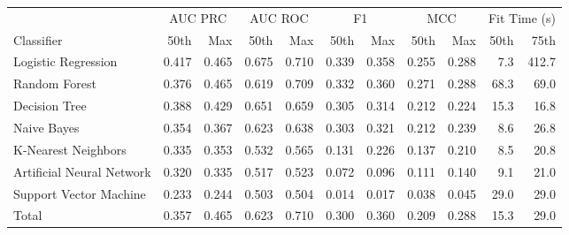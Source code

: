 \begin{tabular}{lrrrrrrrrrr}
\toprule
{} & \multicolumn{2}{c}{AUC PRC}        & \multicolumn{2}{c}{AUC ROC}        &     \multicolumn{2}{c}{F1}       &    \multicolumn{2}{c}{MCC}        & \multicolumn{2}{c}{Fit Time (s)}         \\
{Classifier} &    50th &    Max &    50th &    Max &   50th &    Max &   50th &    Max &         50th &     75th \\
\midrule
Logistic Regression       &   0.417 &  0.465 &   0.675 &  0.710 &  0.339 &  0.358 &  0.255 &  0.288 &        7.3 &  412.7 \\
Random Forest             &   0.376 &  0.465 &   0.619 &  0.709 &  0.332 &  0.360 &  0.271 &  0.288 &       68.3 &   69.0 \\
Decision Tree             &   0.388 &  0.429 &   0.651 &  0.659 &  0.305 &  0.314 &  0.212 &  0.224 &       15.3 &   16.8 \\
Naive Bayes               &   0.354 &  0.367 &   0.623 &  0.638 &  0.303 &  0.321 &  0.212 &  0.239 &        8.6 &   26.8 \\
K-Nearest Neighbors       &   0.335 &  0.353 &   0.532 &  0.565 &  0.131 &  0.226 &  0.137 &  0.210 &        8.5 &   20.8 \\
Artificial Neural Network &   0.320 &  0.335 &   0.517 &  0.523 &  0.072 &  0.096 &  0.111 &  0.140 &        9.1 &   21.0 \\
Support Vector Machine    &   0.233 &  0.244 &   0.503 &  0.504 &  0.014 &  0.017 &  0.038 &  0.045 &       29.0 &   29.0 \\
Total                     &   0.357 &  0.465 &   0.623 &  0.710 &  0.300 &  0.360 &  0.209 &  0.288 &       15.3 &   29.0 \\
\bottomrule
\end{tabular}
